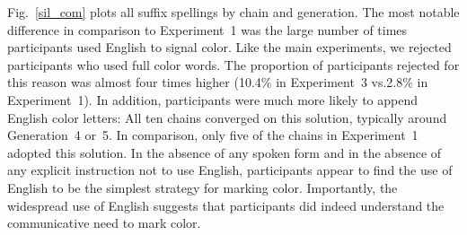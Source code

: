 \documentclass[doc,biblatex]{apa7}
\begin{document}
Fig.~\ref{sil_com} plots all suffix spellings by chain and generation. The most notable difference in comparison to Experiment~1 was the large number of times participants used English to signal color. Like the main experiments, we rejected participants who used full color words. The proportion of participants rejected for this reason was almost four times higher (10.4\% in Experiment~3 vs.\@ 2.8\% in Experiment~1). In addition, participants were much more likely to append English color letters: All ten chains converged on this solution, typically around Generation~4 or~5. In comparison, only five of the chains in Experiment~1 adopted this solution. In the absence of any spoken form and in the absence of any explicit instruction not to use English, participants appear to find the use of English to be the simplest strategy for marking color. Importantly, the widespread use of English suggests that participants did indeed understand the communicative need to mark color.
\end{document}

